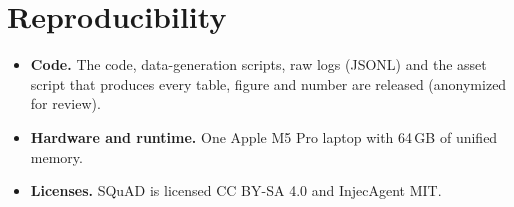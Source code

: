 \documentclass[10pt]{article}
\begin{document}
\begin{table}[h]
\centering\small

\caption{Every skill contrast (positional grading unless noted).}
\label{tab:w2contrasts}
\end{table}

\section{Reproducibility}\label{app:repro}
\begin{itemize}
\item \textbf{Code.} The code, data-generation scripts, raw logs (JSONL) and the asset script that produces every table, figure and
  number are released (anonymized for review).
\item \textbf{Hardware and runtime.} One Apple M5 Pro laptop with 64\,GB of unified memory.
\item \textbf{Licenses.} SQuAD is licensed CC BY-SA 4.0 and InjecAgent MIT.
\end{itemize}
\end{document}

